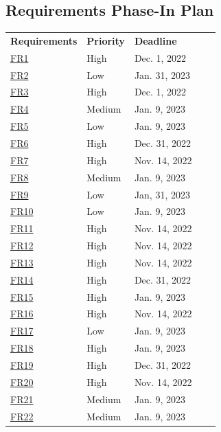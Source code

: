 \documentclass{article}
\begin{document}
\subsection{Requirements Phase-In Plan}
\begin{table}[H]
\centering
\begin{tabular}{|l|l|l|ll}
\cline{1-3}
\textbf{Requirements} & \textbf{Priority} & \textbf{Deadline} &  &  \\ \cline{1-3}
\hyperref[FR1]{FR1}          & High     & Dec. 1, 2022      &  &  \\ \cline{1-3}
\hyperref[FR2]{FR2}          & Low      & Jan. 31, 2023     &  &  \\ \cline{1-3}
\hyperref[FR3]{FR3}          & High     & Dec. 1, 2022      &  &  \\ \cline{1-3}
\hyperref[FR4]{FR4}          & Medium   & Jan. 9, 2023      &  &  \\ \cline{1-3}
\hyperref[FR5]{FR5}          & Low      & Jan. 9, 2023      &  &  \\ \cline{1-3}
\hyperref[FR6]{FR6}          & High     & Dec. 31, 2022     &  &  \\ \cline{1-3}
\hyperref[FR7]{FR7}          & High     & Nov. 14, 2022     &  &  \\ \cline{1-3}
\hyperref[FR8]{FR8}          & Medium   & Jan. 9, 2023      &  &  \\ \cline{1-3}
\hyperref[FR9]{FR9}          & Low      & Jan, 31, 2023     &  &  \\ \cline{1-3}
\hyperref[FR10]{FR10}         & Low      & Jan. 9, 2023      &  &  \\ \cline{1-3}
\hyperref[FR11]{FR11}         & High     & Nov. 14, 2022     &  &  \\ \cline{1-3}
\hyperref[FR12]{FR12}         & High     & Nov. 14, 2022     &  &  \\ \cline{1-3}
\hyperref[FR13]{FR13}         & High     & Nov. 14, 2022     &  &  \\ \cline{1-3}
\hyperref[FR14]{FR14}         & High     & Dec. 31, 2022     &  &  \\ \cline{1-3}
\hyperref[FR15]{FR15}         & High     & Jan. 9, 2023      &  &  \\ \cline{1-3}
\hyperref[FR16]{FR16}         & High     & Nov. 14, 2022     &  &  \\ \cline{1-3}
\hyperref[FR17]{FR17}         & Low      & Jan. 9, 2023      &  &  \\ \cline{1-3}
\hyperref[FR18]{FR18}         & High     & Jan. 9, 2023      &  &  \\ \cline{1-3}
\hyperref[FR19]{FR19}         & High     & Dec. 31, 2022     &  &  \\ \cline{1-3}
\hyperref[FR20]{FR20}         & High     & Nov. 14, 2022     &  &  \\ \cline{1-3}
\hyperref[FR21]{FR21}         & Medium   & Jan. 9, 2023      &  &  \\ \cline{1-3}
\hyperref[FR22]{FR22}         & Medium   & Jan. 9, 2023      &  &  \\ \cline{1-3}
\end{tabular}
\end{table}
\end{document}
